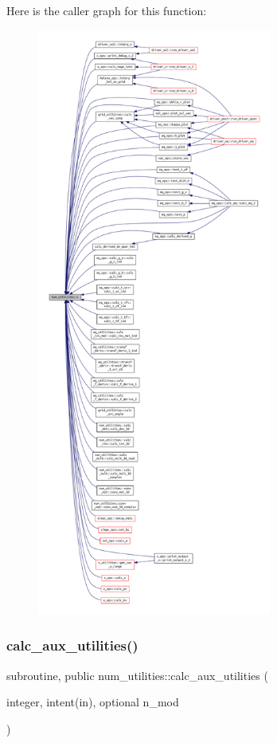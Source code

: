 Here is the caller graph for this function\+:\nopagebreak
\begin{figure}[H]
\begin{center}
\leavevmode
\includegraphics[height=550pt]{namespacenum__utilities_a5ee3fbd1fe67d0deefc7194631389f2a_icgraph}
\end{center}
\end{figure}
\mbox{\label{namespacenum__utilities_af461ae4c95a7a45da875dcf311e323f5}} 
\subsubsection{\texorpdfstring{calc\+\_\+aux\+\_\+utilities()}{calc\_aux\_utilities()}}
{\footnotesize\ttfamily subroutine, public num\+\_\+utilities\+::calc\+\_\+aux\+\_\+utilities (\begin{DoxyParamCaption}\item[{integer, intent(in), optional}]{n\+\_\+mod }\end{DoxyParamCaption})}



